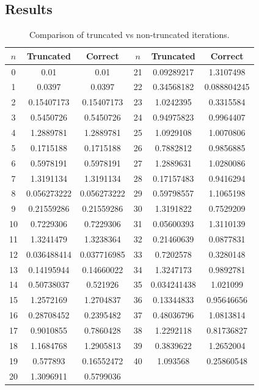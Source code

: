 \documentclass[a4paper, 12pt]{article}
\begin{document}
\subsection{Results}
\begin{table}[H]
\centering
\begin{tabular}{@{}ccc|ccc@{}}
\toprule
$n$ & Truncated   & Correct     & $n$ & Truncated   & Correct \\ \midrule
0   & 0.01        & 0.01        & 21  & 0.09289217  & 1.3107498 \\ \midrule
1   & 0.0397      & 0.0397      & 22  & 0.34568182  & 0.088804245 \\ \midrule
2   & 0.15407173  & 0.15407173  & 23  & 1.0242395   & 0.3315584 \\ \midrule
3   & 0.5450726   & 0.5450726   & 24  & 0.94975823  & 0.9964407 \\ \midrule
4   & 1.2889781   & 1.2889781   & 25  & 1.0929108   & 1.0070806 \\ \midrule
5   & 0.1715188   & 0.1715188   & 26  & 0.7882812   & 0.9856885 \\ \midrule
6   & 0.5978191   & 0.5978191   & 27  & 1.2889631   & 1.0280086 \\ \midrule
7   & 1.3191134   & 1.3191134   & 28  & 0.17157483  & 0.9416294 \\ \midrule
8   & 0.056273222 & 0.056273222 & 29  & 0.59798557  & 1.1065198 \\ \midrule
9   & 0.21559286  & 0.21559286  & 30  & 1.3191822   & 0.7529209 \\ \midrule
10  & 0.7229306   & 0.7229306   & 31  & 0.05600393  & 1.3110139 \\ \midrule
11  & 1.3241479   & 1.3238364   & 32  & 0.21460639  & 0.0877831 \\ \midrule
12  & 0.036488414 & 0.037716985 & 33  & 0.7202578   & 0.3280148 \\ \midrule
13  & 0.14195944  & 0.14660022  & 34  & 1.3247173   & 0.9892781 \\ \midrule
14  & 0.50738037  & 0.521926    & 35  & 0.034241438 & 1.021099 \\ \midrule
15  & 1.2572169   & 1.2704837   & 36  & 0.13344833  & 0.95646656 \\ \midrule
16  & 0.28708452  & 0.2395482   & 37  & 0.48036796  & 1.0813814 \\ \midrule
17  & 0.9010855   & 0.7860428   & 38  & 1.2292118   & 0.81736827 \\ \midrule
18  & 1.1684768   & 1.2905813   & 39  & 0.3839622   & 1.2652004 \\ \midrule
19  & 0.577893    & 0.16552472  & 40  & 1.093568    & 0.25860548 \\ \midrule
20  & 1.3096911   & 0.5799036 \\ \bottomrule
\end{tabular}
\caption{Comparison of truncated vs non-truncated iterations.}
\label{tab:model_truncated}
\end{table}
\end{document}
